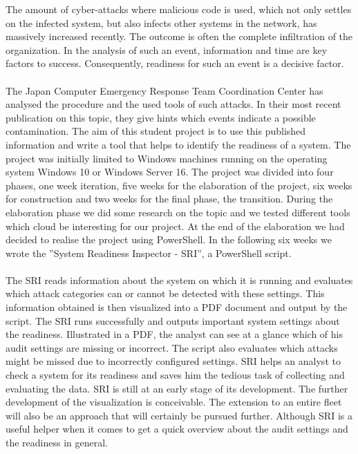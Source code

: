 \thispagestyle{plain}
\renewcommand\section{\stdsection}
\vspace{-0.25cm}
\thispagestyle{plain}
The amount of cyber-attacks where malicious code is used, which not only settles on the infected system, but also infects other systems in the network, has massively increased recently. The outcome is often the complete infiltration of the organization. In the analysis of such an event, information and time are key factors to success. Consequently, readiness for such an event is a decisive factor. \\\\
The Japan Computer Emergency Response Team Coordination Center has analysed the procedure and the used tools of such attacks. In their most recent publication on this topic, they give hints which events indicate a possible contamination. The aim of this student project is to use this published information and write a tool that helps to identify the readiness of a system.
\vspace{-0.25cm}
\thispagestyle{plain}
The project was initially limited to Windows machines running on the operating system Windows 10 or Windows Server 16. The project was divided into four phases, one week iteration, five weeks for the elaboration of the project, six weeks for construction and two weeks for the final phase, the transition. During the elaboration phase we did some research on the topic and we tested different tools which cloud be interesting for our project. At the end of the elaboration we had decided to realise the project using PowerShell. In the following six weeks we wrote the ''System Readiness Inspector - SRI'', a PowerShell script. \\\\
The SRI reads information about the system on which it is running and evaluates which attack categories can or cannot be detected with these settings. This information obtained is then visualized into a PDF document and output by the script.
\vspace{-0.25cm}
\thispagestyle{plain}
The SRI runs successfully and outputs important system settings about the readiness. Illustrated in a PDF, the analyst can see at a glance which of his audit settings are missing or incorrect. The script also evaluates which attacks might be missed due to incorrectly configured settings. SRI helps an analyst to check a system for its readiness and saves him the tedious task of collecting and evaluating the data.
\vspace{-0.25cm}
\thispagestyle{plain}
SRI is still at an early stage of its development. The further development of the visualization is conceivable. The extension to an entire fleet will also be an approach that will certainly be pursued further. Although SRI is a useful helper when it comes to get a quick overview about the audit settings and the readiness in general.



\renewcommand\section{\clearpage\stdsection}